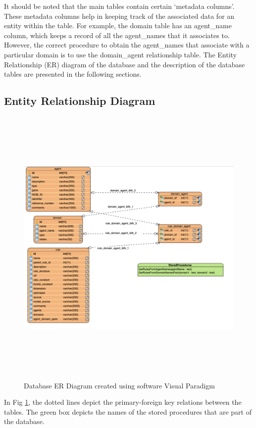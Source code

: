 \documentclass[msc,deptreport,ai]{infthesis}      %
\begin{document}
 It should be noted that the main tables contain certain `metadata columns'. These metadata columns help in keeping track of the associated data for an entity within the table. For example, the domain table has an agent\_name column, which keeps a record of all the agent\_names that it associates to. However, the correct procedure to obtain the agent\_names that associate with a particular domain is to use the domain\_agent relationship table. The Entity Relationship (ER) diagram of the database and the description of the database tables are presented in the following sections.
  \subsection{Entity Relationship Diagram}
  \begin{figure}[H]
  	\centering
  	\captionsetup{justification=centering}
  	\includegraphics[width=\linewidth,height=14cm,keepaspectratio]{er.png}	
  	\caption{Database ER Diagram created using software Visual Paradigm \cite{vd}}
  	\label{fig:er}		
  \end{figure}
  In Fig \ref{fig:er}, the dotted lines depict the primary-foreign key relations between the tables. The green box depicts the names of the stored procedures that are part of the database.
\end{document}
